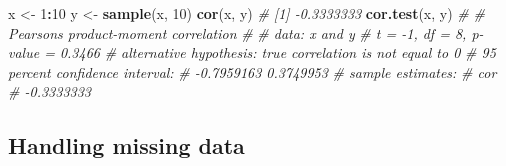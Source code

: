 \documentclass[
]{book}
\newenvironment{Shaded}{\begin{snugshade}}{\end{snugshade}}
\newcommand{\CommentTok}[1]{\textcolor[rgb]{0.56,0.35,0.01}{\textit{#1}}}
\newcommand{\DecValTok}[1]{\textcolor[rgb]{0.00,0.00,0.81}{#1}}
\newcommand{\FunctionTok}[1]{\textcolor[rgb]{0.13,0.29,0.53}{\textbf{#1}}}
\newcommand{\NormalTok}[1]{#1}
\newcommand{\OtherTok}[1]{\textcolor[rgb]{0.56,0.35,0.01}{#1}}
\newcommand{\SpecialCharTok}[1]{\textcolor[rgb]{0.81,0.36,0.00}{\textbf{#1}}}
\begin{document}
\begin{Shaded}
\begin{Highlighting}[]
\NormalTok{x }\OtherTok{\textless{}{-}} \DecValTok{1}\SpecialCharTok{:}\DecValTok{10} 
\NormalTok{y }\OtherTok{\textless{}{-}} \FunctionTok{sample}\NormalTok{(x, }\DecValTok{10}\NormalTok{)}
\FunctionTok{cor}\NormalTok{(x, y)}
\CommentTok{\# [1] {-}0.3333333}
\FunctionTok{cor.test}\NormalTok{(x, y)}
\CommentTok{\# }
\CommentTok{\#   Pearson\textquotesingle{}s product{-}moment correlation}
\CommentTok{\# }
\CommentTok{\# data:  x and y}
\CommentTok{\# t = {-}1, df = 8, p{-}value = 0.3466}
\CommentTok{\# alternative hypothesis: true correlation is not equal to 0}
\CommentTok{\# 95 percent confidence interval:}
\CommentTok{\#  {-}0.7959163  0.3749953}
\CommentTok{\# sample estimates:}
\CommentTok{\#        cor }
\CommentTok{\# {-}0.3333333}
\end{Highlighting}
\end{Shaded}

\subsection{Handling missing data}\label{handling-missing-data}
\end{document}
